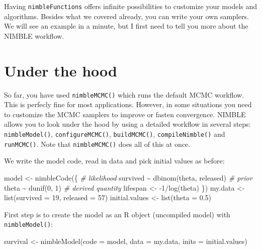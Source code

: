 \documentclass[
  12pt,
]{krantz}
\newenvironment{Shaded}{\begin{snugshade}}{\end{snugshade}}
\newcommand{\AttributeTok}[1]{\textcolor[rgb]{0.77,0.63,0.00}{#1}}
\newcommand{\CommentTok}[1]{\textcolor[rgb]{0.56,0.35,0.01}{\textit{#1}}}
\newcommand{\DecValTok}[1]{\textcolor[rgb]{0.00,0.00,0.81}{#1}}
\newcommand{\FloatTok}[1]{\textcolor[rgb]{0.00,0.00,0.81}{#1}}
\newcommand{\FunctionTok}[1]{\textcolor[rgb]{0.00,0.00,0.00}{#1}}
\newcommand{\NormalTok}[1]{#1}
\newcommand{\OtherTok}[1]{\textcolor[rgb]{0.56,0.35,0.01}{#1}}
\newcommand{\SpecialCharTok}[1]{\textcolor[rgb]{0.00,0.00,0.00}{#1}}
\begin{document}
Having \texttt{nimbleFunctions} offers infinite possibilities to customize your models and algorithms. Besides what we covered already, you can write your own samplers. We will see an example in a minute, but I first need to tell you more about the NIMBLE workflow.

\hypertarget{under-the-hood}{%
\section{Under the hood}\label{under-the-hood}}

So far, you have used \texttt{nimbleMCMC()} which runs the default MCMC workflow. This is perfecly fine for most applications. However, in some situations you need to customize the MCMC samplers to improve or fasten convergence. NIMBLE allows you to look under the hood by using a detailed workflow in several steps: \texttt{nimbleModel()}, \texttt{configureMCMC()}, \texttt{buildMCMC()}, \texttt{compileNimble()} and \texttt{runMCMC()}. Note that \texttt{nimbleMCMC()} does all of this at once.

We write the model code, read in data and pick initial values as before:

\begin{Shaded}
\begin{Highlighting}[]
\NormalTok{model }\OtherTok{\textless{}{-}} \FunctionTok{nimbleCode}\NormalTok{(\{}
  \CommentTok{\# likelihood}
\NormalTok{  survived }\SpecialCharTok{\textasciitilde{}} \FunctionTok{dbinom}\NormalTok{(theta, released)}
  \CommentTok{\# prior}
\NormalTok{  theta }\SpecialCharTok{\textasciitilde{}} \FunctionTok{dunif}\NormalTok{(}\DecValTok{0}\NormalTok{, }\DecValTok{1}\NormalTok{)}
  \CommentTok{\# derived quantity}
\NormalTok{  lifespan }\OtherTok{\textless{}{-}} \SpecialCharTok{{-}}\DecValTok{1}\SpecialCharTok{/}\FunctionTok{log}\NormalTok{(theta)}
\NormalTok{\})}
\NormalTok{my.data }\OtherTok{\textless{}{-}} \FunctionTok{list}\NormalTok{(}\AttributeTok{survived =} \DecValTok{19}\NormalTok{, }\AttributeTok{released =} \DecValTok{57}\NormalTok{)}
\NormalTok{initial.values }\OtherTok{\textless{}{-}} \FunctionTok{list}\NormalTok{(}\AttributeTok{theta =} \FloatTok{0.5}\NormalTok{)}
\end{Highlighting}
\end{Shaded}

First step is to create the model as an R object (uncompiled model) with \texttt{nimbleModel()}:

\begin{Shaded}
\begin{Highlighting}[]
\NormalTok{survival }\OtherTok{\textless{}{-}} \FunctionTok{nimbleModel}\NormalTok{(}\AttributeTok{code =}\NormalTok{ model,}
                        \AttributeTok{data =}\NormalTok{ my.data,}
                        \AttributeTok{inits =}\NormalTok{ initial.values)}
\end{Highlighting}
\end{Shaded}
\end{document}
